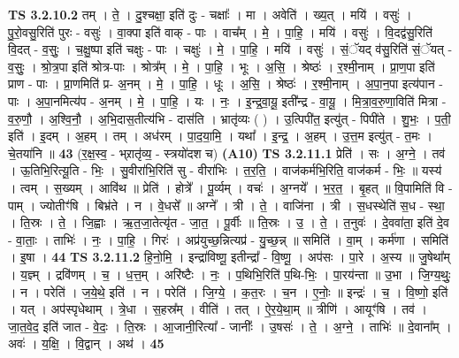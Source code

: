 \documentclass[17pt]{extarticle}
\begin{document}
                  \newline
                                \textbf{ TS 3.2.10.2} \newline
                  तम् । ते॒ । दु॒श्चक्षा॒ इति॑ दुः - चक्षाः᳚ । मा । अवेति॑ । ख्य॒त् । मयि॑ । वसुः॑ । पु॒रो॒वसु॒रिति॑ पुरः - वसुः॑ । वा॒क्पा इति॑ वाक् - पाः । वाच᳚म् । मे॒ । पा॒हि॒ । मयि॑ । वसुः॑ । वि॒दद्व॑सु॒रिति॑ वि॒दत् - व॒सुः॒ । च॒क्षु॒ष्पा इति॑ चक्षुः - पाः । चक्षुः॑ । मे॒ । पा॒हि॒ । मयि॑ । वसुः॑ । सं॒ॅयद् व॑सु॒रिति॑ सं॒ॅयत् - व॒सुः॒ । श्रो॒त्र॒पा इति॑ श्रोत्र-पाः । श्रोत्र᳚म् । मे॒ । पा॒हि॒ । भूः । अ॒सि॒ । श्रेष्ठः॑ । र॒श्मी॒नाम् । प्रा॒ण॒पा इति॑ प्राण - पाः । प्रा॒णमिति॑ प्र- अ॒नम् । मे॒ । पा॒हि॒ । धूः । अ॒सि॒ । श्रेष्ठः॑ । र॒श्मी॒नाम् । अ॒पा॒न॒पा इत्य॑पान - पाः । अ॒पा॒नमित्य॑प - अ॒नम् । मे॒ । पा॒हि॒ । यः । नः॒ । इ॒न्द्र॒वा॒यू॒ इती᳚न्द्र - वा॒यू॒ । मि॒त्रा॒व॒रु॒णा॒विति॑ मित्रा - व॒रु॒णौ॒ । अ॒श्वि॒नौ॒ । अ॒भि॒दास॒तीत्य॑भि - दास॑ति । भ्रातृ॑व्यः ( ) । उ॒त्पिपी॑त॒ इत्यु॑त् - पिपी॑ते । शु॒भः॒ । प॒ती॒ इति॑ । इ॒दम् । अ॒हम् । तम् । अध॑रम् । पा॒द॒या॒मि॒ । यथा᳚ । इ॒न्द्र॒ । अ॒हम् । उ॒त्त॒म इत्यु॑त् - त॒मः । चे॒तया॑नि ॥ \textbf{  43} \newline
                  \newline
                      (र॒क्ष॒स्व॒ - भ्र्रातृ॑व्य॒ - स्त्रयो॑दश च)  \textbf{(A10)} \newline \newline
                                \textbf{ TS 3.2.11.1} \newline
                  प्रेति॑ । सः । अ॒ग्ने॒ । तव॑ । ऊ॒तिभि॒रित्यू॒ति - भिः॒ । सु॒वीरा॑भि॒रिति॑ सु - वीरा॑भिः । त॒र॒ति॒ । वाज॑कर्मभि॒रिति॒ वाज॑कर्म - भिः॒ ॥ यस्य॑ । त्वम् । स॒ख्यम् । आवि॑थ ॥ प्रेति॑ । होत्रे᳚ । पू॒र्व्यम् । वचः॑ । अ॒ग्नये᳚ । भ॒र॒त॒ । बृ॒हत् ॥ वि॒पामिति॑ वि - पाम् । ज्योतीꣳ॑षि । बिभ्र॑ते । न । वे॒धसे᳚ ॥ अग्ने᳚ । त्री । ते॒ । वाजि॑ना । त्री । स॒धस्थेति॑ स॒ध - स्था॒ । ति॒स्रः । ते॒ । जि॒ह्वाः । ऋ॒त॒जा॒तेत्यृ॑त - जा॒त॒ । पू॒र्वीः ॥ ति॒स्रः । उ॒ । ते॒ । त॒नुवः॑ । दे॒ववा॑ता॒ इति॑ दे॒व - वा॒ताः॒ । ताभिः॑ । नः॒ । पा॒हि॒ । गिरः॑ । अप्र॑युच्छ॒न्नित्यप्र॑ - यु॒च्छ॒न्न् ॥ समिति॑ । वा॒म् । कर्म॑णा । समिति॑ । इ॒षा । \textbf{  44} \newline
                  \newline
                                \textbf{ TS 3.2.11.2} \newline
                  हि॒नो॒मि॒ । इन्द्रा॑विष्णू॒ इतीन्द्रा᳚ - वि॒ष्णू॒ । अप॑सः । पा॒रे । अ॒स्य ॥ जु॒षेथा᳚म् । य॒ज्ञ्म् । द्रवि॑णम् । च॒ । ध॒त्त॒म् । अरि॑ष्टैः । नः॒ । प॒थिभि॒रिति॑ प॒थि-भिः॒ । पा॒रय॑न्ता ॥ उ॒भा । जि॒ग्य॒थुः॒ । न । परेति॑ । ज॒ये॒थे॒ इति॑ । न । परेति॑ । जि॒ग्ये॒ । क॒त॒रः । च॒न । ए॒नोः॒ ॥ इन्द्रः॑ । च॒ । वि॒ष्णो॒ इति॑ । यत् । अप॑स्पृधेथाम् । त्रे॒धा । स॒हस्र᳚म् । वीति॑ । तत् । ऐ॒र॒ये॒था॒म् ॥ त्रीणि॑ । आयूꣳ॑षि । तव॑ । जा॒त॒वे॒द॒ इति॑ जात - वे॒दः॒ । ति॒स्रः । आ॒जानी॒रित्या᳚ - जानीः᳚ । उ॒षसः॑ । ते॒ । अ॒ग्ने॒ । ताभिः॑ ॥ दे॒वाना᳚म् । अवः॑ । य॒क्षि॒ । वि॒द्वान् । अथ॑ । \textbf{  45} \newline
\end{document}
